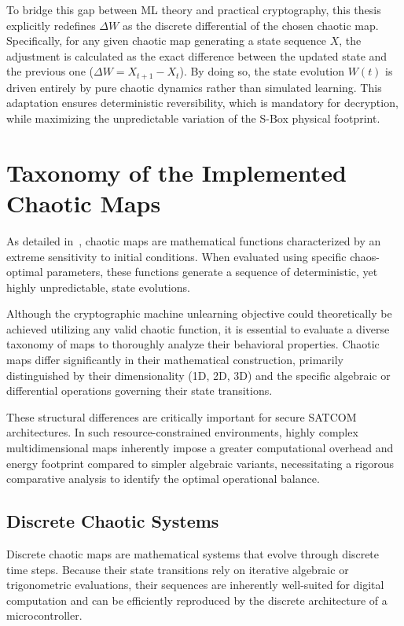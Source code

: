 \documentclass[11pt,a4paper]{report}
\begin{document}
To bridge this gap between ML theory and practical cryptography, this thesis explicitly redefines $\Delta W$ as the discrete differential of the chosen chaotic map. 
Specifically, for any given chaotic map generating a state sequence $X$, the adjustment is calculated as the exact difference between the updated state and the previous one ($\Delta W = X_{t+1} - X_t$). 
By doing so, the state evolution $W(t)$ is driven entirely by pure chaotic dynamics rather than simulated learning. 
This adaptation ensures deterministic reversibility, which is mandatory for decryption, while maximizing the unpredictable variation of the S-Box physical footprint.

\section{Taxonomy of the Implemented Chaotic Maps}
As detailed in~\cite[p. 7]{origineMappeCaotiche}, chaotic maps are mathematical functions characterized by an extreme sensitivity to initial conditions. 
When evaluated using specific chaos-optimal parameters, these functions generate a sequence of deterministic, yet highly unpredictable, state evolutions.

Although the cryptographic machine unlearning objective could theoretically be achieved utilizing any valid chaotic function, 
it is essential to evaluate a diverse taxonomy of maps to thoroughly analyze their behavioral properties. 
Chaotic maps differ significantly in their mathematical construction, primarily distinguished by their dimensionality (1D, 2D, 3D) and the specific algebraic or differential operations governing their state transitions.

These structural differences are critically important for secure SATCOM architectures. 
In such resource-constrained environments, highly complex multidimensional maps inherently impose a greater computational overhead and energy footprint compared to simpler algebraic variants, necessitating a rigorous comparative analysis to identify the optimal operational balance.

\subsection{Discrete Chaotic Systems}
Discrete chaotic maps are mathematical systems that evolve through discrete time steps. 
Because their state transitions rely on iterative algebraic or trigonometric evaluations, their sequences are inherently well-suited for digital computation and can be efficiently reproduced by the discrete architecture of a microcontroller.
\end{document}
